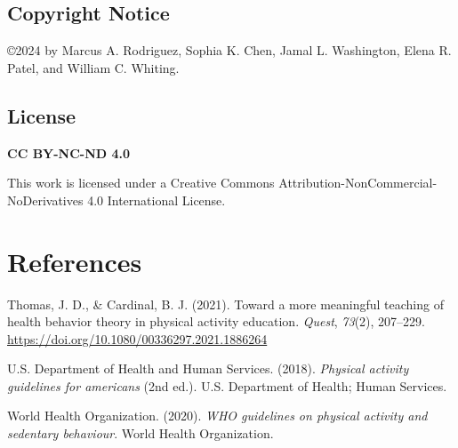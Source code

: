 \documentclass[
  jou,
  floatsintext,
  longtable,
  nolmodern,
  notxfonts,
  notimes,
  colorlinks=true,linkcolor=blue,citecolor=blue,urlcolor=blue]{apa7}
\newlength{\cslhangindent}
\newenvironment{CSLReferences}[2] %
 {\begin{list}{}{%
  \setlength{\itemindent}{0pt}
  \setlength{\leftmargin}{0pt}
  \setlength{\parsep}{0pt}
  \ifodd #1
   \setlength{\leftmargin}{\cslhangindent}
   \setlength{\itemindent}{-1\cslhangindent}
  \fi
  \setlength{\itemsep}{#2\baselineskip}}}
 {\end{list}}
\begin{document}
\subsection{Copyright Notice}\label{copyright-notice}

\noindent \copyright 2024 by Marcus A. Rodriguez, Sophia K. Chen, Jamal
L. Washington, Elena R. Patel, and William C. Whiting.

\subsection{License}\label{license}

\noindent \textbf{CC BY-NC-ND 4.0}

\noindent This work is licensed under a Creative Commons
Attribution-NonCommercial-NoDerivatives 4.0 International License.

\section{References}\label{references}

\label{refs}
\begin{CSLReferences}{1}{0}
Thomas, J. D., \& Cardinal, B. J. (2021). Toward a more meaningful
teaching of health behavior theory in physical activity education.
\emph{Quest}, \emph{73}(2), 207--229.
\url{https://doi.org/10.1080/00336297.2021.1886264}

U.S. Department of Health and Human Services. (2018). \emph{Physical
activity guidelines for americans} (2nd ed.). U.S. Department of Health;
Human Services.

World Health Organization. (2020). \emph{WHO guidelines on physical
activity and sedentary behaviour}. World Health Organization.

\end{CSLReferences}
\end{document}
